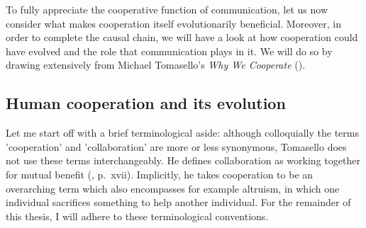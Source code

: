 
To fully appreciate the cooperative function of communication, let us now consider what makes cooperation itself evolutionarily beneficial. Moreover, in order to complete the causal chain, we will have a look at how cooperation could have evolved and the role that communication plays in it. We will do so by drawing extensively from Michael Tomasello's \emph{Why We Cooperate} (\citeyear{Tomasello09}).

\subsection{Human cooperation and its evolution}
\label{sec:comm:cooperation}

Let me start off with a brief terminological aside: although colloquially the terms 'cooperation' and 'collaboration' are more or less synonymous, Tomasello does not use these terms interchangeably. He defines collaboration as working together for mutual benefit (\citeyear{Tomasello09}, p.~xvii). Implicitly, he takes cooperation to be an overarching term which also encompasses for example altruism, in which one individual sacrifices something to help another individual. For the remainder of this thesis, I will adhere to these terminological conventions.

